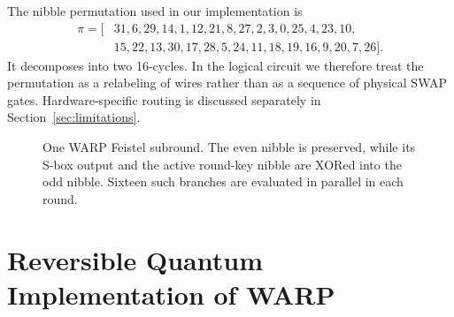 \documentclass[10pt,a4paper]{article}
\newcommand{\Sb}{S_{b0}}
\begin{document}
The nibble permutation used in our implementation is
\begin{align}
\pi = [&31,6,29,14,1,12,21,8,27,2,3,0,25,4,23,10,\nonumber\\
       &15,22,13,30,17,28,5,24,11,18,19,16,9,20,7,26].
\end{align}
It decomposes into two 16-cycles. In the logical circuit we therefore treat the permutation as a relabeling of wires rather than as a sequence of physical SWAP gates. Hardware-specific routing is discussed separately in Section~\ref{sec:limitations}.

\begin{figure}[tbp]
\centering
{}
\caption{One WARP Feistel subround. The even nibble is preserved, while its S-box output and the active round-key nibble are XORed into the odd nibble. Sixteen such branches are evaluated in parallel in each round.}
\label{fig:warp_subround}
\end{figure}

\section{Reversible Quantum Implementation of WARP}
\end{document}
